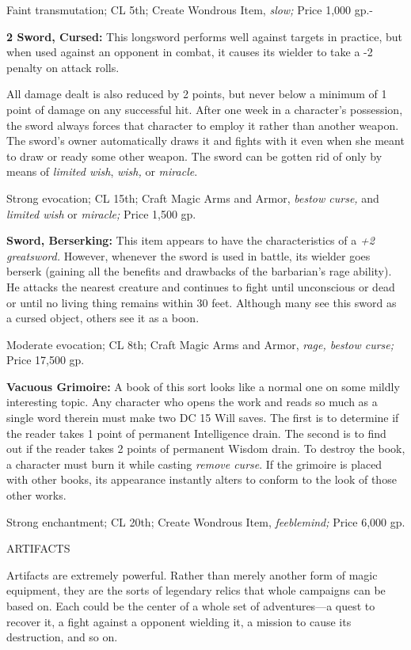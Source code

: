 \documentclass{article}
\begin{document}
Faint transmutation; CL 5th; Create Wondrous Item, \textit{slow; }Price 1,000 gp.-

\textbf{2 Sword, Cursed:} This longsword performs well against targets in practice, 
but when used against an opponent in combat, it causes its wielder to take a -2 
penalty on attack rolls.

All damage dealt is also reduced by 2 points, but never below a minimum of 1 point 
of damage on any successful hit. After one week in a character's possession, the 
sword always forces that character to employ it rather than another weapon. The 
sword's owner automatically draws it and fights with it even when she meant to 
draw or ready some other weapon. The sword can be gotten rid of only by means of 
\textit{limited wish}, \textit{wish, }or \textit{miracle}.

Strong evocation; CL 15th; Craft Magic Arms and Armor, \textit{bestow curse, }and 
\textit{limited wish }or \textit{miracle; }Price 1,500 gp.

\textbf{Sword, Berserking: }This item appears to have the characteristics of a 
\textit{+2 greatsword. }However, whenever the sword is used in battle, its wielder 
goes berserk (gaining all the benefits and drawbacks of the barbarian's rage ability). 
He attacks the nearest creature and continues to fight until unconscious or dead 
or until no living thing remains within 30 feet. Although many see this sword as 
a cursed object, others see it as a boon.

Moderate evocation; CL 8th; Craft Magic Arms and Armor, \textit{rage, bestow curse; 
}Price 17,500 gp.

\textbf{Vacuous Grimoire: }A book of this sort looks like a normal one on some 
mildly interesting topic. Any character who opens the work and reads so much as 
a single word therein must make two DC 15 Will saves. The first is to determine 
if the reader takes 1 point of permanent Intelligence drain. The second is to find 
out if the reader takes 2 points of permanent Wisdom drain. To destroy the book, 
a character must burn it while casting \textit{remove curse}. If the grimoire is 
placed with other books, its appearance instantly alters to conform to the look 
of those other works.

Strong enchantment; CL 20th; Create Wondrous Item, \textit{feeblemind; }Price 6,000 
gp.

\vspace{24pt}
{\LARGE{}ARTIFACTS}

Artifacts are extremely powerful. Rather than merely another form of magic equipment, 
they are the sorts of legendary relics that whole campaigns can be based on. Each 
could be the center of a whole set of adventures---a quest to recover it, a fight 
against a opponent wielding it, a mission to cause its destruction, and so on.
\end{document}
